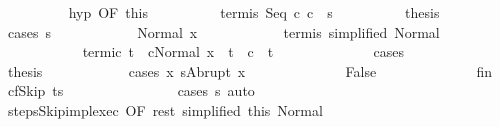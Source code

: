 \begin{isabellebody}
\isanewline
\ \ \ \ \ \ \ \ \isamarkupfalse%
\ hyp\ {\isacharbrackleft}OF\ this{\isacharbrackright}\isanewline
\ \ \ \ \ \ \ \ \isamarkupfalse%
\ termi{\isacharunderscore}s{\isacharprime}{\isacharprime}{\isacharcolon}\ {\isachardoublequoteopen}{\isasymGamma}{\isasymturnstile}Seq\ c{\isacharprime}{\isacharprime}\ c\ {\isasymdown}\ s{\isacharprime}{\isacharprime}{\isachardoublequoteclose}\isacommand{{\isachardot}}\isamarkupfalse%
\isanewline
\ \ \ \ \ \ \ \ \isamarkupfalse%
\ {\isacharquery}thesis\isanewline
\ \ \ \ \ \ \ \ \isamarkupfalse%
\ {\isacharparenleft}cases\ s{\isacharprime}{\isacharprime}{\isacharparenright}\isanewline
\ \ \ \ \ \ \ \ \ \ \isamarkupfalse%
\ {\isacharparenleft}Normal\ x{\isacharparenright}\isanewline
\ \ \ \ \ \ \ \ \ \ \isamarkupfalse%
\ termi{\isacharunderscore}s{\isacharprime}{\isacharprime}\ {\isacharbrackleft}simplified\ Normal{\isacharbrackright}\isanewline
\ \ \ \ \ \ \ \ \ \ \isamarkupfalse%
\ termi{\isacharunderscore}c\ {\isachardoublequoteopen}{\isasymforall}t{\isachardot}\ {\isasymGamma}{\isasymturnstile}\ {\isasymlangle}c{\isacharprime}{\isacharprime}{\isacharcomma}Normal\ x{\isasymrangle}\ {\isasymRightarrow}\ t\ {\isasymlongrightarrow}\ {\isasymGamma}{\isasymturnstile}c\ {\isasymdown}\ t{\isachardoublequoteclose}\isanewline
\ \ \ \ \ \ \ \ \ \ \ \ \isamarkupfalse%
\ cases\isanewline
\ \ \ \ \ \ \ \ \ \ \isamarkupfalse%
\ {\isacharquery}thesis\isanewline
\ \ \ \ \ \ \ \ \ \ \isamarkupfalse%
\ {\isacharparenleft}cases\ {\isachardoublequoteopen}{\isasymexists}x{\isacharprime}{\isachardot}\ s{\isacharprime}{\isacharequal}Abrupt\ x{\isacharprime}{\isachardoublequoteclose}{\isacharparenright}\isanewline
\ \ \ \ \ \ \ \ \ \ \ \ \isamarkupfalse%
\ False\isanewline
\ \ \ \ \ \ \ \ \ \ \ \ \isamarkupfalse%
\ fin\ \isamarkupfalse%
\ {\isachardoublequoteopen}c\isactrlsub f{\isacharequal}Skip{\isachardoublequoteclose}\ {\isachardoublequoteopen}t{\isacharequal}s{\isacharprime}{\isachardoublequoteclose}\isanewline
\ \ \ \ \ \ \ \ \ \ \ \ \ \ \isamarkupfalse%
\ {\isacharparenleft}cases\ s{\isacharprime}{\isacharparenright}\ auto\isanewline
\ \ \ \ \ \ \ \ \ \ \ \ \isamarkupfalse%
\ steps{\isacharunderscore}Skip{\isacharunderscore}impl{\isacharunderscore}exec\ {\isacharbrackleft}OF\ rest\ {\isacharbrackleft}simplified\ this{\isacharbrackright}{\isacharbrackright}\ Normal\isanewline

\end{isabellebody}
